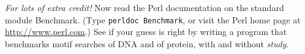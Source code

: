 \textit{For lots of extra credit!} Now read the Perl documentation on the standard module Benchmark. (Type \verb|perldoc Benchmark|, or visit the Perl home page at \href{http://www.perl.com}{http://www.perl.com}.) See if your guess is right by writing a program that benchmarks motif searches of DNA and of protein, with and without \textit{study}. 
